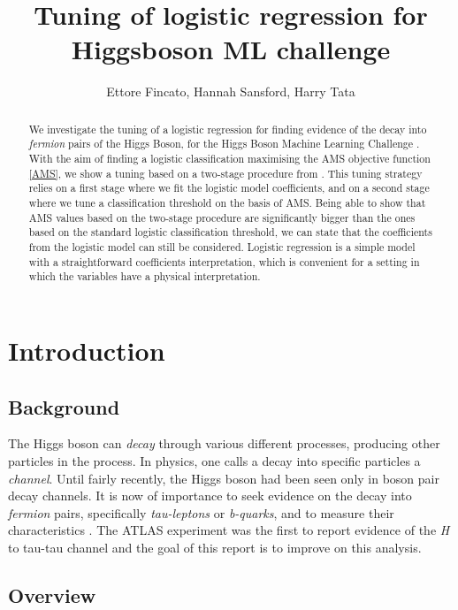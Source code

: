\documentclass[]{article}
\title{Tuning of logistic regression for Higgsboson ML challenge}
\author{Ettore Fincato, Hannah Sansford, Harry Tata}
\begin{document}
\maketitle

\begin{abstract}

We investigate the tuning of a logistic regression for finding evidence of the decay into \textit{fermion} pairs of the Higgs Boson, for the Higgs Boson Machine Learning Challenge \cite{higgs-challenge}. With the aim of finding a logistic classification maximising the AMS objective function \ref{AMS}, we show a tuning based on a two-stage procedure from \cite{kotlowski2014consistent}. This tuning strategy relies on a first stage where we fit the logistic model coefficients, and on a second stage where we tune a classification threshold on the basis of AMS. Being able to show that AMS values based on the two-stage procedure are significantly bigger than the ones based on the standard logistic classification threshold, we can state that the coefficients from the logistic model can still be considered. Logistic regression is a simple model with a straightforward coefficients interpretation, which is convenient for a setting in which the variables have a physical interpretation.

\end{abstract}

\section{Introduction}

\subsection{Background}

The Higgs boson can \textit{decay} through various different processes, producing other particles in the process. In physics, one calls a decay into specific particles a \textit{channel}. Until fairly recently, the Higgs boson had been seen only in boson pair decay channels. It is now of importance to seek evidence on the decay into \textit{fermion} pairs, specifically \textit{tau-leptons} or \textit{b-quarks}, and to measure their characteristics \cite{higgs-challenge}. The ATLAS experiment \cite{ATLAS-experiment} was the first to report evidence of the \textit{H} to tau-tau channel and the goal of this report is to improve on this analysis.


\subsection{Overview}
\end{document}
